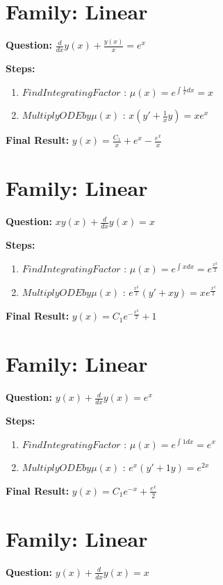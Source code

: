 \documentclass{article}
\begin{document}
\section*{Family: Linear}
\textbf{Question:} $\frac{d}{d x} y{\left(x \right)} + \frac{y{\left(x \right)}}{x} = e^{x}$

\textbf{Steps:}
\begin{enumerate}
\item $Find Integrating Factor$ :  $\mu(x) = e^{\int \frac{1}{x} dx} = x$
\item $Multiply ODE by \mu(x)$ :  $x(y' + \frac{1}{x}y) = x e^{x}$
\end{enumerate}
\textbf{Final Result:} $y{\left(x \right)} = \frac{C_{1}}{x} + e^{x} - \frac{e^{x}}{x}$

\section*{Family: Linear}
\textbf{Question:} $x y{\left(x \right)} + \frac{d}{d x} y{\left(x \right)} = x$

\textbf{Steps:}
\begin{enumerate}
\item $Find Integrating Factor$ :  $\mu(x) = e^{\int x dx} = e^{\frac{x^{2}}{2}}$
\item $Multiply ODE by \mu(x)$ :  $e^{\frac{x^{2}}{2}}(y' + xy) = x e^{\frac{x^{2}}{2}}$
\end{enumerate}
\textbf{Final Result:} $y{\left(x \right)} = C_{1} e^{- \frac{x^{2}}{2}} + 1$

\section*{Family: Linear}
\textbf{Question:} $y{\left(x \right)} + \frac{d}{d x} y{\left(x \right)} = e^{x}$

\textbf{Steps:}
\begin{enumerate}
\item $Find Integrating Factor$ :  $\mu(x) = e^{\int 1 dx} = e^{x}$
\item $Multiply ODE by \mu(x)$ :  $e^{x}(y' + 1y) = e^{2 x}$
\end{enumerate}
\textbf{Final Result:} $y{\left(x \right)} = C_{1} e^{- x} + \frac{e^{x}}{2}$

\section*{Family: Linear}
\textbf{Question:} $y{\left(x \right)} + \frac{d}{d x} y{\left(x \right)} = x$
\end{document}
